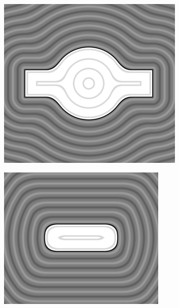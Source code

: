 \begin{figure}
\centering
\begin{minipage}{.5\textwidth}
  \centering
  \includegraphics[width=.8\linewidth]{imagens/smoothUnion.png}
  \label{fig:sunion}
\end{minipage}%
\begin{minipage}{.5\textwidth}
  \centering
  \includegraphics[width=.8\linewidth]{imagens/smoothIntersection.png}
  \label{fig:sinter}
\end{minipage}
\end{figure}
